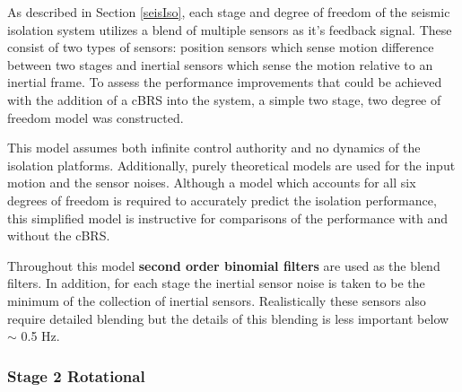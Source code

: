 \documentclass [12pt, proquest]{uwthesis}[2019]
\begin{document}
%

As described in Section \ref{seisIso}, each stage and degree of freedom of the seismic isolation system utilizes a blend of multiple sensors as it's feedback signal. These consist of two types of sensors: position sensors which sense motion difference between two stages and inertial sensors which sense the motion relative to an inertial frame. To assess the performance improvements that could be achieved with the addition of a cBRS into the system, a simple two stage, two degree of freedom model was constructed. 

This model assumes both infinite control authority and no dynamics of the isolation platforms. Additionally, purely theoretical models are used for the input motion and the sensor noises. Although a model which accounts for all six degrees of freedom is required to accurately predict the isolation performance, this simplified model is instructive for comparisons of the performance with and without the cBRS.

Throughout this model \textbf{second order binomial filters} are used as the blend filters. In addition, for each stage the inertial sensor noise is taken to be the minimum of the collection of inertial sensors. Realistically these sensors also require detailed blending but the details of this blending is less important below $\sim$ 0.5 Hz. 

\subsubsection{Stage 2 Rotational}
\end{document}
